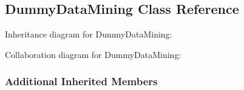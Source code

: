 \hypertarget{a00014}{}\subsection{Dummy\+Data\+Mining Class Reference}
\label{a00014}


Inheritance diagram for Dummy\+Data\+Mining\+:


Collaboration diagram for Dummy\+Data\+Mining\+:
\subsubsection*{Additional Inherited Members}
